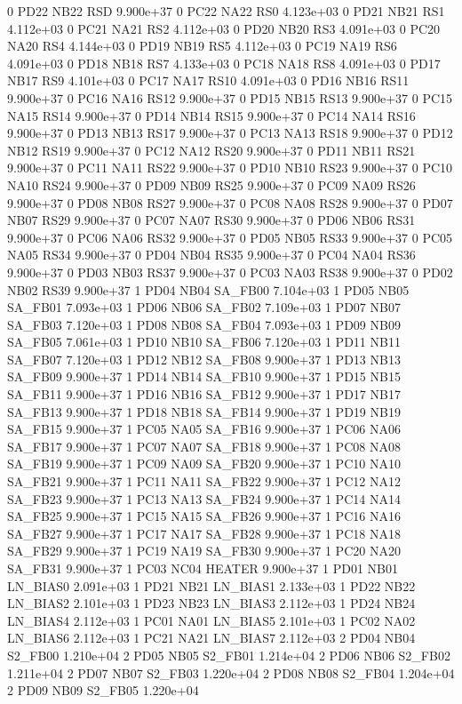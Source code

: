 0 PD22 NB22 RSD 9.900e+37 
0 PC22 NA22 RS0 4.123e+03 
0 PD21 NB21 RS1 4.112e+03 
0 PC21 NA21 RS2 4.112e+03 
0 PD20 NB20 RS3 4.091e+03 
0 PC20 NA20 RS4 4.144e+03 
0 PD19 NB19 RS5 4.112e+03 
0 PC19 NA19 RS6 4.091e+03 
0 PD18 NB18 RS7 4.133e+03 
0 PC18 NA18 RS8 4.091e+03 
0 PD17 NB17 RS9 4.101e+03 
0 PC17 NA17 RS10 4.091e+03 
0 PD16 NB16 RS11 9.900e+37 
0 PC16 NA16 RS12 9.900e+37 
0 PD15 NB15 RS13 9.900e+37 
0 PC15 NA15 RS14 9.900e+37 
0 PD14 NB14 RS15 9.900e+37 
0 PC14 NA14 RS16 9.900e+37 
0 PD13 NB13 RS17 9.900e+37 
0 PC13 NA13 RS18 9.900e+37 
0 PD12 NB12 RS19 9.900e+37 
0 PC12 NA12 RS20 9.900e+37 
0 PD11 NB11 RS21 9.900e+37 
0 PC11 NA11 RS22 9.900e+37 
0 PD10 NB10 RS23 9.900e+37 
0 PC10 NA10 RS24 9.900e+37 
0 PD09 NB09 RS25 9.900e+37 
0 PC09 NA09 RS26 9.900e+37 
0 PD08 NB08 RS27 9.900e+37 
0 PC08 NA08 RS28 9.900e+37 
0 PD07 NB07 RS29 9.900e+37 
0 PC07 NA07 RS30 9.900e+37 
0 PD06 NB06 RS31 9.900e+37 
0 PC06 NA06 RS32 9.900e+37 
0 PD05 NB05 RS33 9.900e+37 
0 PC05 NA05 RS34 9.900e+37 
0 PD04 NB04 RS35 9.900e+37 
0 PC04 NA04 RS36 9.900e+37 
0 PD03 NB03 RS37 9.900e+37 
0 PC03 NA03 RS38 9.900e+37 
0 PD02 NB02 RS39 9.900e+37 
1 PD04 NB04 SA_FB00 7.104e+03 
1 PD05 NB05 SA_FB01 7.093e+03 
1 PD06 NB06 SA_FB02 7.109e+03 
1 PD07 NB07 SA_FB03 7.120e+03 
1 PD08 NB08 SA_FB04 7.093e+03 
1 PD09 NB09 SA_FB05 7.061e+03 
1 PD10 NB10 SA_FB06 7.120e+03 
1 PD11 NB11 SA_FB07 7.120e+03 
1 PD12 NB12 SA_FB08 9.900e+37 
1 PD13 NB13 SA_FB09 9.900e+37 
1 PD14 NB14 SA_FB10 9.900e+37 
1 PD15 NB15 SA_FB11 9.900e+37 
1 PD16 NB16 SA_FB12 9.900e+37 
1 PD17 NB17 SA_FB13 9.900e+37 
1 PD18 NB18 SA_FB14 9.900e+37 
1 PD19 NB19 SA_FB15 9.900e+37 
1 PC05 NA05 SA_FB16 9.900e+37 
1 PC06 NA06 SA_FB17 9.900e+37 
1 PC07 NA07 SA_FB18 9.900e+37 
1 PC08 NA08 SA_FB19 9.900e+37 
1 PC09 NA09 SA_FB20 9.900e+37 
1 PC10 NA10 SA_FB21 9.900e+37 
1 PC11 NA11 SA_FB22 9.900e+37 
1 PC12 NA12 SA_FB23 9.900e+37 
1 PC13 NA13 SA_FB24 9.900e+37 
1 PC14 NA14 SA_FB25 9.900e+37 
1 PC15 NA15 SA_FB26 9.900e+37 
1 PC16 NA16 SA_FB27 9.900e+37 
1 PC17 NA17 SA_FB28 9.900e+37 
1 PC18 NA18 SA_FB29 9.900e+37 
1 PC19 NA19 SA_FB30 9.900e+37 
1 PC20 NA20 SA_FB31 9.900e+37 
1 PC03 NC04 HEATER 9.900e+37 
1 PD01 NB01 LN_BIAS0 2.091e+03 
1 PD21 NB21 LN_BIAS1 2.133e+03 
1 PD22 NB22 LN_BIAS2 2.101e+03 
1 PD23 NB23 LN_BIAS3 2.112e+03 
1 PD24 NB24 LN_BIAS4 2.112e+03 
1 PC01 NA01 LN_BIAS5 2.101e+03 
1 PC02 NA02 LN_BIAS6 2.112e+03 
1 PC21 NA21 LN_BIAS7 2.112e+03 
2 PD04 NB04 S2_FB00 1.210e+04 
2 PD05 NB05 S2_FB01 1.214e+04 
2 PD06 NB06 S2_FB02 1.211e+04 
2 PD07 NB07 S2_FB03 1.220e+04 
2 PD08 NB08 S2_FB04 1.204e+04 
2 PD09 NB09 S2_FB05 1.220e+04 
